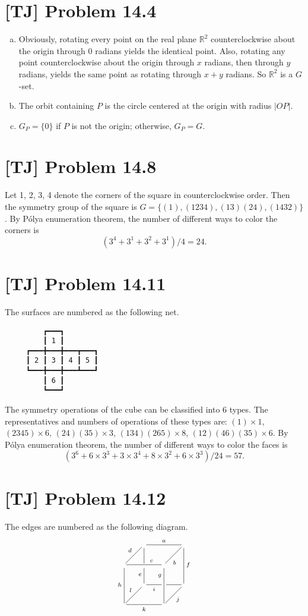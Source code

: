 \documentclass[a4paper,11pt,twocolumn]{article}
\begin{document}
  \section{[TJ] Problem 14.4}
  \begin{enumerate}[(a)]
    \item Obviously, rotating every point on the real plane $\mathbb{R}^2$ counterclockwise about the origin through 0 radians yields the identical point. Also, rotating any point counterclockwise about the origin through $x$ radians, then through $y$ radians, yields the same point as rotating through $x+y$ radians. So $\mathbb{R}^2$ is a $G$-set.
    \item The orbit containing $P$ is the circle centered at the origin with radius $|OP|$.
    \item $G_P = \{0\}$ if $P$ is not the origin; otherwise, $G_P = G$.
  \end{enumerate}

  \section{[TJ] Problem 14.8}
  Let 1, 2, 3, 4 denote the corners of the square in counterclockwise order. Then the symmetry group of the square is $G = \{(1), (1234), (13)(24), (1432)\}$. By P\'{o}lya enumeration theorem, the number of different ways to color the corners is
 $$ (3^4 + 3^1 + 3^2 + 3^1) / 4 = 24.$$

  \section{[TJ] Problem 14.11}
  The surfaces are numbered as the following net.
  {\linespread{1.0}
  \begin{verbatim}
         ┏━━━┓
         ┃ 1 ┃
     ┏━━━╋━━━╋━━━┳━━━┓
     ┃ 2 ┃ 3 ┃ 4 ┃ 5 ┃
     ┗━━━╋━━━╋━━━┻━━━┛
         ┃ 6 ┃
         ┗━━━┛
  \end{verbatim}}
  The symmetry operations of the cube can be classified into 6 types. The representatives and numbers of operations of these types are: $(1) \times 1$, $(2345) \times 6$, $(24)(35) \times 3$, $(134)(265) \times 8$, $(12)(46)(35) \times 6$. By P\'{o}lya enumeration theorem, the number of different ways to color the faces is
  $$ (3^6 + 6 \times 3^3 + 3 \times 3^4 + 8 \times 3^2 + 6 \times 3^3) /24 = 57.$$

  \section{[TJ] Problem 14.12}
  The edges are numbered as the following diagram.
  $$
  \xymatrix@!0{
  &  \ar@{-}[rr]^a \ar@{-}'[d][dd]_e
      &  &  \ar@{-}[dd]^f        \\
   \ar@{-}[ur]^d\ar@{-}[rr]^>>>>>c\ar@{-}[dd]_h
      &  &  \ar@{-}[ur]_<<<<b\ar@{-}[dd]_<<<<g \\
  &  \ar@{-}'[r]_<<<<i[rr]
      &  &                 \\
   \ar@{-}[rr]_k\ar@{-}[ur]^l
      &  &  \ar@{-}[ur]_j        }
  $$
\end{document}
